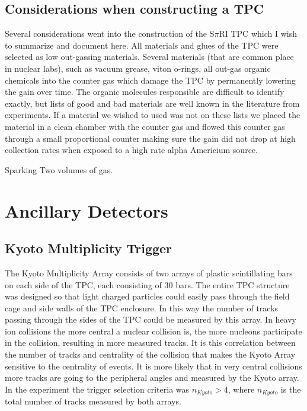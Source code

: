 \subsection{Considerations when constructing a TPC}
Several considerations went into the construction of the S$\pi$RI TPC which I wish to summarize and document here. All materials and glues of the TPC were selected as low out-gassing materials. Several materials (that are common place in nuclear labs), such as vacuum grease, viton o-rings, all out-gas organic chemicals into the counter gas which damage the TPC by permanently lowering the gain over time. The organic molecules responsible are difficult to identify exactly, but lists of good and bad materials are well known in the literature from experiments. If a material we wished to used was not on these lists we placed the material in a clean chamber with the counter gas and flowed this counter gas through a small proportional counter making sure the gain did not drop at high collection rates when exposed to a high rate alpha Americium source. 

Sparking
Two volumes of gas. 



\section{Ancillary Detectors }


\subsection{Kyoto Multiplicity Trigger}
The Kyoto Multiplicity Array consists of two arrays of plastic scintillating bars on each side of the TPC, each consisting of 30 bars. The entire TPC structure was designed so that light charged particles could easily pass through  the field cage and  side walls of the TPC enclosure. In this way the number of tracks passing through the sides of the TPC could be measured by this array. In heavy ion collisions the more central a nuclear collision is, the more nucleons participate in the collision, resulting in more measured tracks. It is this correlation between the number of tracks and centrality of the collision that makes the Kyoto Array sensitive to the centrality of events. It is more likely that in very central collisions more tracks are going to the peripheral angles and measured by the Kyoto array. In the experiment the trigger selection criteria was $n_{Kyoto} > 4$, where $n_{Kyoto}$ is the total number of tracks measured by both arrays. 

